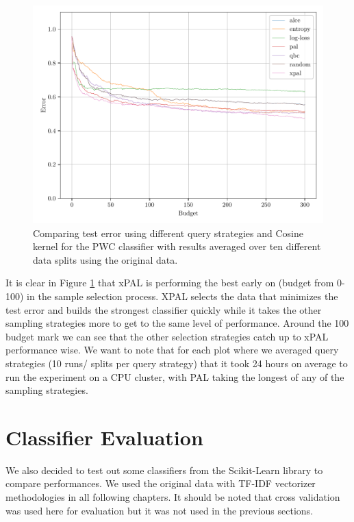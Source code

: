 \begin{figure}[ht]
    \centering
    \includegraphics[width=\scale\textwidth]{../img/plot_text_data_original_proper_vectorizer_test_results.pdf}
    \caption{Comparing test error using different query strategies and Cosine kernel for the PWC classifier with results averaged over ten different data splits using the original data.}
    \label{fig:cos_avg_test_results}
\end{figure}

It is clear in Figure \ref{fig:cos_avg_test_results} that xPAL is performing the best early on (budget from 0-100) in the sample selection process. XPAL selects the data that minimizes the test error and builds the strongest classifier quickly while it takes the other sampling strategies more to get to the same level of performance. Around the 100 budget mark we can see that the other selection strategies catch up to xPAL performance wise. We want to note that for each plot where we averaged query strategies (10 runs/ splits per query strategy) that it took 24 hours on average to run the experiment on a CPU cluster, with PAL taking the longest of any of the sampling strategies.

\clearpage

\section{Classifier Evaluation}
\label{sec:classifier_evaluation}

We also decided to test out some classifiers from the Scikit-Learn library to compare performances. We used the original data with TF-IDF vectorizer methodologies in all following chapters. It should be noted that cross validation was used here for evaluation but it was not used in the previous sections.

